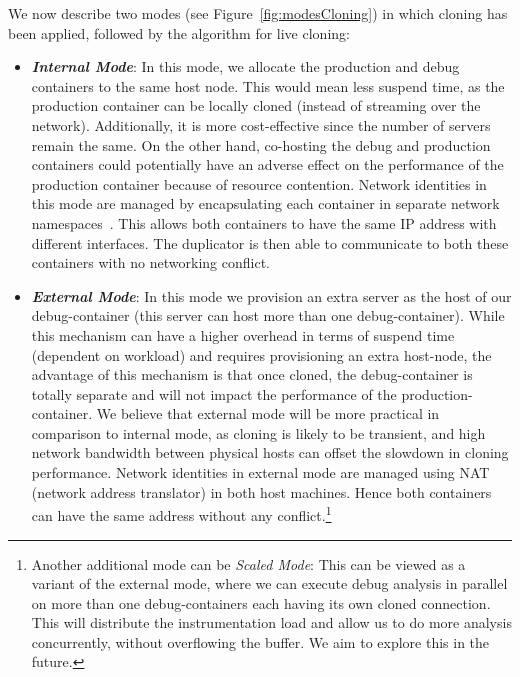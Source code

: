 \noindent
We now describe two modes (see Figure~\ref{fig:modesCloning}) in which cloning has been applied, followed by the algorithm for live cloning:

\begin{itemize}
	
	\item \textbf{\textit{Internal Mode}}: In this mode, we allocate the production and debug containers to the same host node. 
	This would mean less suspend time, as the production container can be locally cloned (instead of streaming over the network). 
	Additionally, it is more cost-effective since the number of servers remain the same.
	On the other hand, co-hosting the debug and production containers could potentially have an adverse effect on the performance of the production container because of resource contention.
	Network identities in this mode are managed by encapsulating each container in separate network namespaces~\cite{netns}.
	This allows both containers to have the same IP address with different interfaces.
	The duplicator is then able to communicate to both these containers with no networking conflict.
	
	
	\item \textbf{\textit{External Mode}}: In this mode we provision an extra server as the host of our debug-container (this server can host more than one debug-container). 
	While this mechanism can have a higher overhead in terms of suspend time (dependent on workload) and requires provisioning an extra host-node, the advantage of this mechanism is that once cloned, the debug-container is totally separate and will not impact the performance of the production-container.
	We believe that external mode will be more practical in comparison to internal mode, as cloning is likely to be transient, and high network bandwidth between physical hosts can offset the slowdown in cloning performance. 
	Network identities in external mode are managed using NAT~\cite{nat} (network address translator) in both host machines. 
	Hence both containers can have the same address without any conflict.\footnote{Another additional mode can be \textit{Scaled Mode}: This can be viewed as a variant of the external mode, where we can execute debug analysis in parallel on more than one debug-containers each having its own cloned connection. This will distribute the instrumentation load and allow us to do more analysis concurrently, without overflowing the buffer. We aim to explore this in the future.}
	
\end{itemize}

